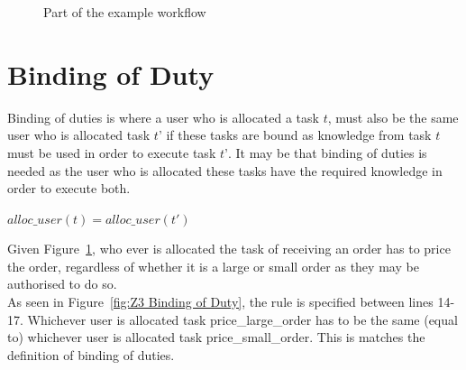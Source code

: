 \documentclass[a4paper]{report}
\begin{document}
\begin{figure}[!htb]
\centering
{}
\caption{Part of the example workflow}
\label{fig:Part of the example workflow}
\end{figure}

\section{Binding of Duty}
Binding of duties\cite{bod} is where a user who is allocated a task $t$, must also be the same user who is allocated task $t’$ if these tasks are bound as knowledge from task $t$ must be used in order to execute task $t’$. It may be that binding of duties is needed as the user who is allocated these tasks have the required knowledge in order to execute both.\\
\begin{center}
$alloc\_user(t) = alloc\_user(t\ensuremath{'})$
\end{center}

Given Figure~\ref{fig:Part of the example workflow}, who ever is allocated the task of receiving an order has to price the order, regardless of whether it is a large or small order as they may be authorised to do so. \\

As seen in Figure~\ref{fig:Z3 Binding of Duty}, the rule is specified between lines 14-17. Whichever user is allocated task price\_large\_order has to be the same (equal to) whichever user is allocated task price\_small\_order. This is matches the definition of binding of duties.\\
\end{document}
